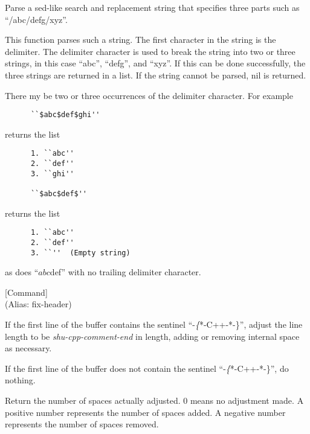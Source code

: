 \begin{doc-string}
Parse a sed-like search and replacement string that specifies three parts
such as ``/abc/defg/xyz''.

This function parses such a string.  The first character in the string is the
delimiter.  The delimiter character is used to break the string into two or
three strings, in this case ``abc'', ``defg'', and ``xyz''.  If this can be done
successfully, the three strings are returned in a list.  If the string cannot be
parsed, nil is returned.

There my be two or three occurrences of the delimiter character.  For example

\small{\begin{verbatim}
      ``$abc$def$ghi''
\end{verbatim}}

returns the list

\small{\begin{verbatim}
      1. ``abc''
      2. ``def''
      3. ``ghi''

      ``$abc$def$''
\end{verbatim}}

returns the list

\small{\begin{verbatim}
      1. ``abc''
      2. ``def''
      3. ``''  (Empty string)
\end{verbatim}}

as does ``$abc$def'' with no trailing delimiter character.
\end{doc-string}

\vspace{1em}
\noindent
{}
\usebox{\funcname}
 \hfill [Command]\\%
 (Alias: fix-header)

\begin{doc-string}
If the first line of the buffer contains the sentinel ``-\emph\{*-C++-*-\}'', adjust
the line length to be \emph{shu-cpp-comment-end} in length, adding or removing
internal space as necessary.

If the first line of the buffer does not contain the sentinel ``-\emph\{*-C++-*-\}'',
do nothing.

Return the number of spaces actually adjusted.  0 means no adjustment made.
A positive number represents the number of spaces added.  A negative number
represents the number of spaces removed.
\end{doc-string}


